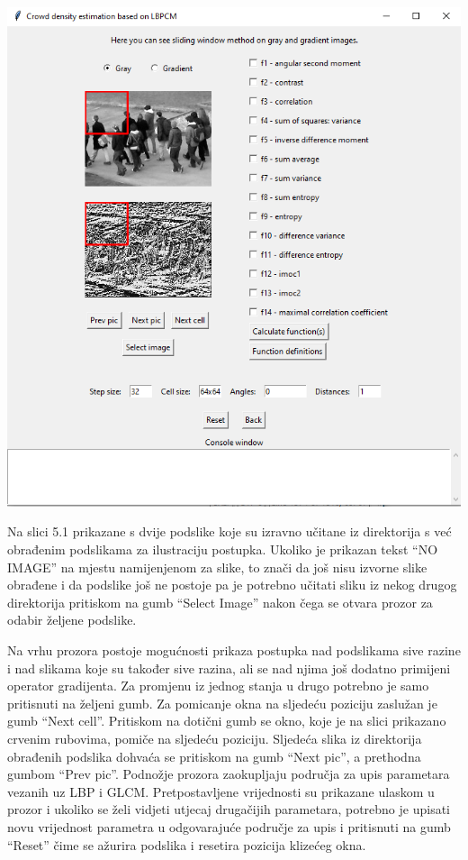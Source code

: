 \documentclass[times, utf8, zavrsni]{fer}
\begin{document}
\begin{minipage}{\linewidth}
\centering
\includegraphics[scale=0.6]{img/sw1.png}
\end{minipage}

\bigbreak

Na slici 5.1 prikazane s dvije podslike koje su izravno učitane iz direktorija
s već obrađenim podslikama za ilustraciju postupka. Ukoliko je prikazan tekst 
\enquote{NO IMAGE} na mjestu namijenjenom za slike, to znači da još nisu 
izvorne slike obrađene i da podslike 
još ne postoje pa je potrebno učitati sliku iz nekog drugog direktorija pritiskom 
na gumb \enquote{Select Image} nakon čega se otvara prozor za odabir željene podslike.

\newpage

Na vrhu prozora postoje mogućnosti prikaza postupka nad podslikama sive 
razine i nad slikama koje su također sive razina, ali se nad njima još dodatno 
primijeni operator gradijenta. Za promjenu iz jednog stanja u
drugo potrebno je samo pritisnuti na željeni gumb. Za pomicanje okna na sljedeću
poziciju zaslužan je gumb \enquote{Next cell}. Pritiskom na dotični gumb se okno, koje
je na slici prikazano crvenim rubovima, pomiče na sljedeću poziciju. Sljedeća slika iz 
direktorija obrađenih podslika dohvaća se pritiskom na gumb \enquote{Next pic}, a 
prethodna gumbom \enquote{Prev pic}. Podnožje prozora zaokupljaju 
područja za upis parametara vezanih uz LBP i GLCM. Pretpostavljene vrijednosti
su prikazane ulaskom u prozor i ukoliko se želi vidjeti utjecaj drugačijih parametara,
potrebno je upisati novu vrijednost parametra u odgovarajuće područje za upis i
pritisnuti na gumb \enquote{Reset} čime se ažurira podslika i resetira pozicija 
klizećeg okna.
\end{document}
